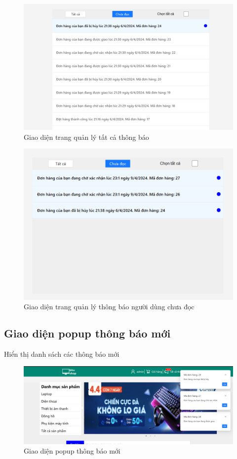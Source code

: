 \begin{figure}[H]
    \begin{center}
    \includegraphics[scale=0.5]{images/hieu/chap-5/noti.png}
    \vspace*{3mm}
    \caption{Giao diện trang quản lý tất cả thông báo}
    \end{center}
\end{figure}
\begin{figure}[H]
    \begin{center}
    \includegraphics[scale=0.5]{images/hieu/chap-5/noti-notread.png}
    \vspace*{3mm}
    \caption{Giao diện trang quản lý thông báo người dùng chưa đọc }
    \end{center}
\end{figure}
\subsection{Giao diện popup thông báo mới}
\noindent Hiển thị danh sách các thông báo mới
\begin{figure}[H]
    \begin{center}
    \includegraphics[scale=0.35]{images/hieu/chap-5/popup.png}
    \vspace*{3mm}
    \caption{Giao diện popup thông báo mới}
    \end{center}
\end{figure}
